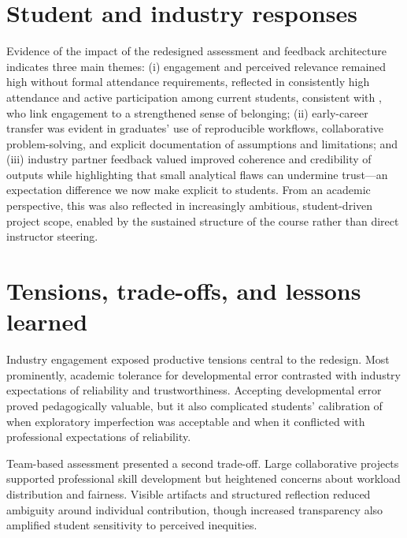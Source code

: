 \section{Student and industry responses}

Evidence of the impact of the redesigned assessment and feedback architecture indicates three main themes: (i) engagement and perceived relevance remained high without formal attendance requirements, reflected in consistently high attendance and active participation among current students, consistent with \textcite{freeman2007belonging}, who link engagement to a strengthened sense of belonging; (ii) early-career transfer was evident in graduates' use of reproducible workflows, collaborative problem-solving, and explicit documentation of assumptions and limitations; and (iii) industry partner feedback valued improved coherence and credibility of outputs while highlighting that small analytical flaws can undermine trust—an expectation difference we now make explicit to students. From an academic perspective, this was also reflected in increasingly ambitious, student-driven project scope, enabled by the sustained structure of the course rather than direct instructor steering.

\section{Tensions, trade-offs, and lessons learned}

Industry engagement exposed productive tensions central to the redesign. Most prominently, academic tolerance for developmental error contrasted with industry expectations of reliability and trustworthiness. Accepting developmental error proved pedagogically valuable, but it also complicated students' calibration of when exploratory imperfection was acceptable and when it conflicted with professional expectations of reliability.

Team-based assessment presented a second trade-off. Large collaborative projects supported professional skill development but heightened concerns about workload distribution and fairness. Visible artifacts and structured reflection reduced ambiguity around individual contribution, though increased transparency also amplified student sensitivity to perceived inequities.

